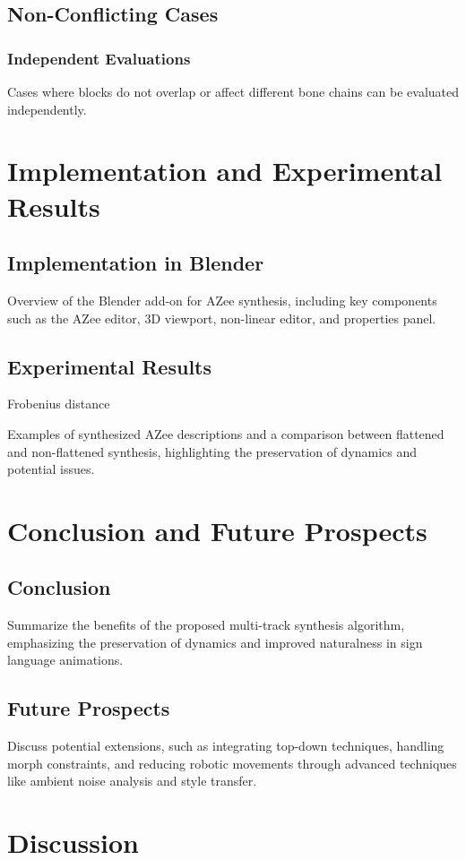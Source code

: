\documentclass[../../main.tex]{subfiles}
\begin{document}
\subsection{Non-Conflicting Cases}
\subsubsection{Independent Evaluations}
Cases where blocks do not overlap or affect different bone chains can be evaluated independently.

\section{Implementation and Experimental Results}
\subsection{Implementation in Blender}
Overview of the Blender add-on for AZee synthesis, including key components such as the AZee editor, 3D viewport, non-linear editor, and properties panel.

\subsection{Experimental Results}


Frobenius distance 

Examples of synthesized AZee descriptions and a comparison between flattened and non-flattened synthesis, highlighting the preservation of dynamics and potential issues.

\section{Conclusion and Future Prospects}
\subsection{Conclusion}
Summarize the benefits of the proposed multi-track synthesis algorithm, emphasizing the preservation of dynamics and improved naturalness in sign language animations.

\subsection{Future Prospects}
Discuss potential extensions, such as integrating top-down techniques, handling morph constraints, and reducing robotic movements through advanced techniques like ambient noise analysis and style transfer.



\section{Discussion}
\end{document}
